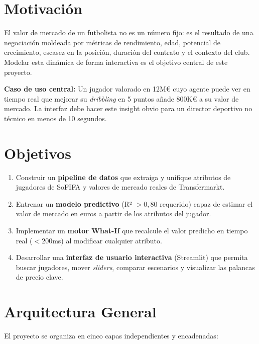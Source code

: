 \documentclass[12pt,a4paper]{report}
\begin{document}
\section{Motivación}

El valor de mercado de un futbolista no es un número fijo: es el resultado de una negociación moldeada por métricas de rendimiento, edad, potencial de crecimiento, escasez en la posición, duración del contrato y el contexto del club. Modelar esta dinámica de forma interactiva es el objetivo central de este proyecto.

\begin{infobox}
\textbf{Caso de uso central:} Un jugador valorado en 12M€ cuyo agente puede ver en tiempo real que mejorar su \textit{dribbling} en 5 puntos añade 800K€ a su valor de mercado. La interfaz debe hacer este insight obvio para un director deportivo no técnico en menos de 10 segundos.
\end{infobox}

\section{Objetivos}

\begin{enumerate}[leftmargin=*]
  \item Construir un \textbf{pipeline de datos} que extraiga y unifique atributos de jugadores de SoFIFA y valores de mercado reales de Transfermarkt.
  \item Entrenar un \textbf{modelo predictivo} (R² $> 0{,}80$ requerido) capaz de estimar el valor de mercado en euros a partir de los atributos del jugador.
  \item Implementar un \textbf{motor What-If} que recalcule el valor predicho en tiempo real ($< 200$ms) al modificar cualquier atributo.
  \item Desarrollar una \textbf{interfaz de usuario interactiva} (Streamlit) que permita buscar jugadores, mover \textit{sliders}, comparar escenarios y visualizar las palancas de precio clave.
\end{enumerate}

\section{Arquitectura General}

El proyecto se organiza en cinco capas independientes y encadenadas:
\end{document}
